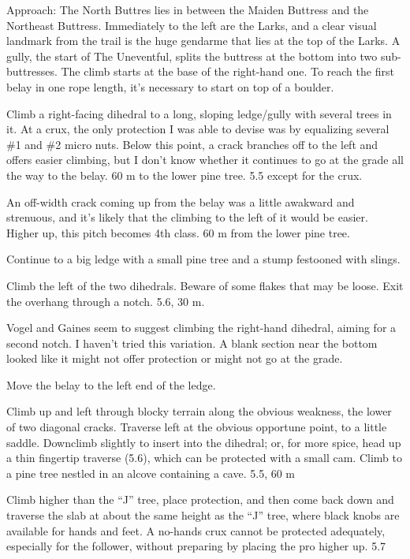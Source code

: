 \documentclass{tahquitz}
\begin{document}
Approach: The North Buttres lies
in between the Maiden Buttress and the Northeast Buttress. Immediately
to the left are the Larks, and a clear visual landmark from the trail
is the huge gendarme that lies at the top of the Larks. A gully, the start
of The Uneventful, splits the buttress at the bottom into two sub-buttresses.
The climb starts at the base of the right-hand one.
To reach the first belay in one rope length, it's necessary to start on top of a boulder.

 Climb a right-facing dihedral to a long, sloping ledge/gully with
several trees in it. At a crux, the only protection I was able to devise was by
equalizing several \#1 and \#2 micro nuts. Below this point, a crack branches off
to the left and offers easier climbing, but I don't know whether it continues
to go at the grade all the way to the belay. 60 m to the lower pine tree. 5.5 except for
the crux.

 An off-width crack coming up from the belay was a little awakward and strenuous, and
it's likely that the climbing to the left of it would be easier. Higher up, this pitch
becomes 4th class. 60 m from the lower pine tree.

 Continue to a big ledge with a small pine tree and a stump festooned with
slings.

 Climb the left of the two dihedrals. Beware of some flakes that may be loose.
Exit the overhang through a notch. 5.6, 30 m.

 Vogel and Gaines seem to suggest climbing the right-hand dihedral,
aiming for a second notch. I haven't tried this variation.
A blank section near the bottom looked like it might not
offer protection or might not go at the grade.

 Move the belay to the left end of the ledge.


 Climb up and left through blocky terrain along the obvious weakness, the
lower of two diagonal cracks. Traverse left at the obvious opportune point, to a
little saddle. Downclimb slightly to insert into the dihedral; or, for more spice,
head up a thin fingertip traverse (5.6),
which can be protected with a small cam.
Climb to a pine tree nestled in an alcove containing a cave. 5.5, 60 m

 Climb higher than the ``J'' tree, place protection, and then come
back down and traverse the slab at about the same height as the ``J'' tree, where black
knobs are available for hands and feet. A no-hands crux cannot be protected adequately,
especially for the follower, without preparing by placing the pro higher up. 5.7
\end{document}
